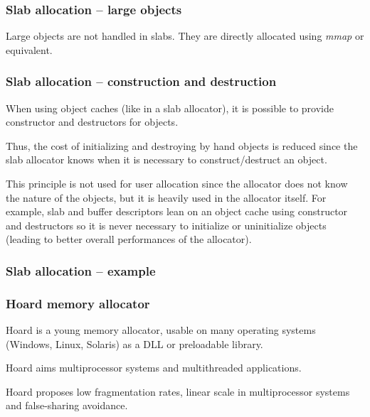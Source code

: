 
\begin{frame}
  \frametitle{Slab allocation -- large objects}

  Large objects are not handled in slabs. They are directly allocated
  using \emph{mmap} or equivalent.

\end{frame}


\begin{frame}
  \frametitle{Slab allocation -- construction and destruction}

  When using object caches (like in a slab allocator), it is possible
  to provide constructor and destructors for objects.

  \-

  Thus, the cost of initializing and destroying by hand objects is
  reduced since the slab allocator knows when it is necessary to
  construct/destruct an object.

  \-

  This principle is not used for user allocation since the allocator
  does not know the nature of the objects, but it is heavily used in
  the allocator itself. For example, slab and buffer descriptors lean
  on an object cache using constructor and destructors so it is never
  necessary to initialize or uninitialize objects (leading to better
  overall performances of the allocator).

\end{frame}


\begin{frame}
  \frametitle{Slab allocation -- example}

  \begin{center}
  \end{center}

\end{frame}


\begin{frame}
  \frametitle{Hoard memory allocator}

  Hoard is a young memory allocator, usable on many operating systems
  (Windows, Linux, Solaris) as a DLL or preloadable library.

  \-

  Hoard aims multiprocessor systems and multithreaded applications.

  \-

  Hoard proposes low fragmentation rates, linear scale in
  multiprocessor systems and false-sharing avoidance.

\end{frame}

